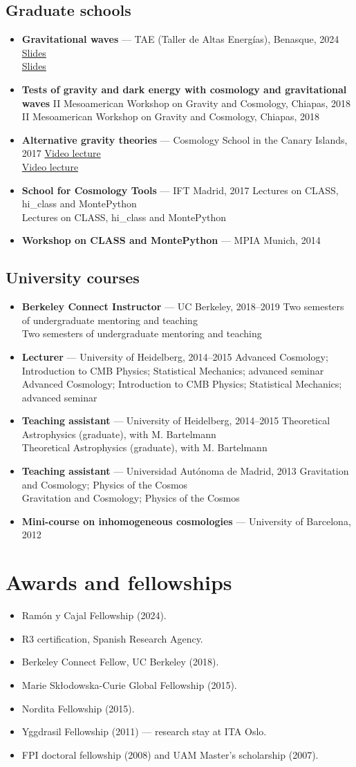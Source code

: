 \documentclass[11pt,a4paper]{article}
\newcommand{\entry}[2]{%
  \item {#1}%
  \ifx\relax#2\relax\else\\[0.1em]{\small\color{soft}#2}\fi
}
\newenvironment{entries}
  {\begin{itemize}[leftmargin=1.1em,itemsep=0.32em,parsep=0pt,topsep=0.3em]}
  {\end{itemize}}
\newenvironment{plainlist}
  {\begin{itemize}[leftmargin=1.1em,itemsep=0.2em,parsep=0pt,topsep=0.3em]}
  {\end{itemize}}
\begin{document}
\subsection{Graduate schools}
\begin{entries}
  \entry{\textbf{Gravitational waves} --- TAE (Taller de Altas Energías), Benasque, 2024}
        {\href{https://www.benasque.org/2024tae/talks_contr/094_GW_Lectures_-_TAE_2024_-_Zumalacarregui_-_PDF.pdf}{Slides}}
  \entry{\textbf{Tests of gravity and dark energy with cosmology and gravitational waves}}
        {II Mesoamerican Workshop on Gravity and Cosmology, Chiapas, 2018}
  \entry{\textbf{Alternative gravity theories} --- Cosmology School in the Canary Islands, 2017}
        {\href{http://iactalks.iac.es/talks/view/1081}{Video lecture}}
  \entry{\textbf{School for Cosmology Tools} --- IFT Madrid, 2017}
        {Lectures on CLASS, hi\_class and MontePython}
  \entry{\textbf{Workshop on CLASS and MontePython} --- MPIA Munich, 2014}{}
\end{entries}

\subsection{University courses}
\begin{entries}
  \entry{\textbf{Berkeley Connect Instructor} --- UC Berkeley, 2018--2019}
        {Two semesters of undergraduate mentoring and teaching}
  \entry{\textbf{Lecturer} --- University of Heidelberg, 2014--2015}
        {Advanced Cosmology; Introduction to CMB Physics; Statistical Mechanics; advanced seminar}
  \entry{\textbf{Teaching assistant} --- University of Heidelberg, 2014--2015}
        {Theoretical Astrophysics (graduate), with M. Bartelmann}
  \entry{\textbf{Teaching assistant} --- Universidad Autónoma de Madrid, 2013}
        {Gravitation and Cosmology; Physics of the Cosmos}
  \entry{\textbf{Mini-course on inhomogeneous cosmologies} --- University of Barcelona, 2012}{}
\end{entries}

\section{Awards and fellowships}
\begin{plainlist}
  \item Ramón y Cajal Fellowship (2024).
  \item R3 certification, Spanish Research Agency.
  \item Berkeley Connect Fellow, UC Berkeley (2018).
  \item Marie Skłodowska-Curie Global Fellowship (2015).
  \item Nordita Fellowship (2015).
  \item Yggdrasil Fellowship (2011) --- research stay at ITA Oslo.
  \item FPI doctoral fellowship (2008) and UAM Master's scholarship (2007).
\end{plainlist}
\end{document}
